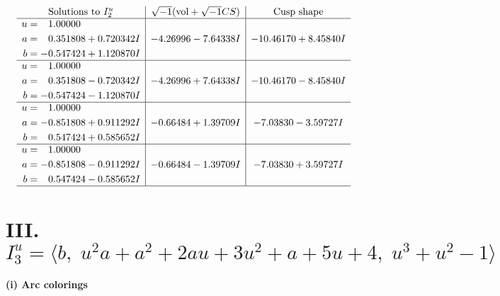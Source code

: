 \documentclass[1p]{elsarticle_modified}
\theoremstyle{definition}
\newcommand{\I}{\sqrt{-1}}
\begin{document}
$$\begin{array}{c|c|c}  
\text{Solutions to }I^u_{2}& \I (\text{vol} + \sqrt{-1}CS) & \text{Cusp shape}\\
 \hline 
\begin{aligned}
u &= \phantom{-}1.00000\phantom{ +0.000000I} \\
a &= \phantom{-}0.351808 + 0.720342 I \\
b &= -0.547424 + 1.120870 I\end{aligned}
 & -4.26996 - 7.64338 I & -10.46170 + 8.45840 I \\ \hline\begin{aligned}
u &= \phantom{-}1.00000\phantom{ +0.000000I} \\
a &= \phantom{-}0.351808 - 0.720342 I \\
b &= -0.547424 - 1.120870 I\end{aligned}
 & -4.26996 + 7.64338 I & -10.46170 - 8.45840 I \\ \hline\begin{aligned}
u &= \phantom{-}1.00000\phantom{ +0.000000I} \\
a &= -0.851808 + 0.911292 I \\
b &= \phantom{-}0.547424 + 0.585652 I\end{aligned}
 & -0.66484 + 1.39709 I & -7.03830 - 3.59727 I \\ \hline\begin{aligned}
u &= \phantom{-}1.00000\phantom{ +0.000000I} \\
a &= -0.851808 - 0.911292 I \\
b &= \phantom{-}0.547424 - 0.585652 I\end{aligned}
 & -0.66484 - 1.39709 I & -7.03830 + 3.59727 I\\
 \hline 
 \end{array}$$\newpage\newpage\renewcommand{\arraystretch}{1}
\centering \section*{III. $I^u_{3}= \langle b,\;u^2 a+a^2+2 a u+3 u^2+a+5 u+4,\;u^3+u^2-1 \rangle$}
\flushleft \textbf{(i) Arc colorings}\\
\end{document}
